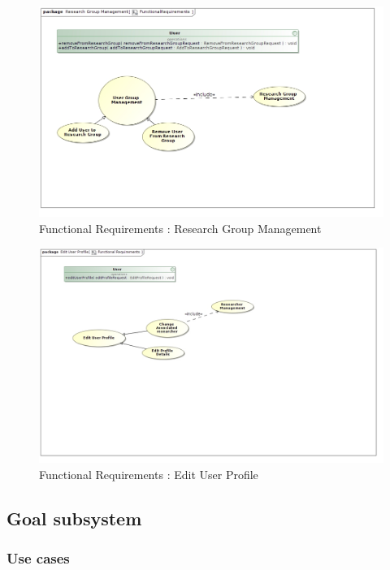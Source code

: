 \documentclass{article}
\begin{document}
		\begin{figure}[H]
			\includegraphics[scale=0.5]{ReinhardtImages/FunctionalRequirementsResearchGroupManagement.jpg}
			\caption{Functional Requirements : Research Group Management}
	  		\label{Functional Requirements : Research Group Management}
		\end{figure}
		\begin{figure}[H]
			\includegraphics[scale=0.45]{ReinhardtImages/Functional RequirementsEditUserProfile.jpg}
			\caption{Functional Requirements : Edit User Profile}
	  		\label{Functional Requirements : Edit User Profile}
		\end{figure}
	
\subsection{Goal subsystem}
	\subsubsection{Use cases}
\end{document}
